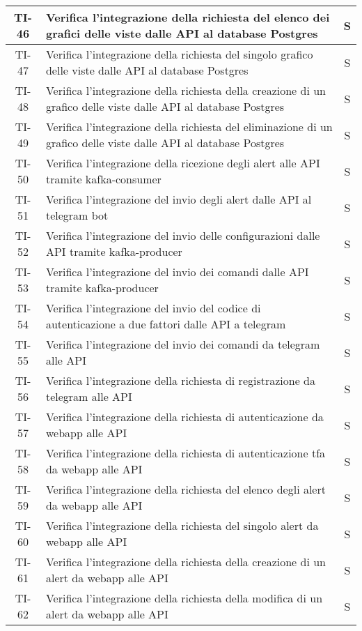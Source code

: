 \begin{center}
\begin{longtable}{|c|p{12cm}|c|}
			\hline
			TI-46 & Verifica l'integrazione della richiesta del elenco dei grafici delle viste dalle API al database Postgres & S \\
			\hline
			TI-47 & Verifica l'integrazione della richiesta del singolo grafico delle viste dalle API al database Postgres & S \\
			\hline
			TI-48 & Verifica l'integrazione della richiesta della creazione di un grafico delle viste dalle API al database Postgres & S \\
			\hline
			TI-49 & Verifica l'integrazione della richiesta del eliminazione di un grafico delle viste dalle API al database Postgres & S \\
			\hline
			TI-50 & Verifica l'integrazione della ricezione degli alert alle API tramite kafka-consumer & S \\
			\hline
			TI-51 & Verifica l'integrazione del invio degli alert dalle API al telegram bot & S \\
			\hline
			TI-52 & Verifica l'integrazione del invio delle configurazioni dalle API tramite kafka-producer & S \\
			\hline
			TI-53 & Verifica l'integrazione del invio dei comandi dalle API tramite kafka-producer & S \\
			\hline
			TI-54 & Verifica l'integrazione del invio del codice di autenticazione a due fattori dalle API a telegram & S \\
			\hline
			TI-55 & Verifica l'integrazione del invio dei comandi da telegram alle API & S \\
			\hline
			TI-56 & Verifica l'integrazione della richiesta di registrazione da telegram alle API & S \\
			\hline
			TI-57 & Verifica l'integrazione della richiesta di autenticazione da webapp alle API & S \\
			\hline
			TI-58 & Verifica l'integrazione della richiesta di autenticazione tfa da webapp alle API & S \\
			\hline
			TI-59 & Verifica l'integrazione della richiesta del elenco degli alert da webapp alle API & S \\
			\hline
			TI-60 & Verifica l'integrazione della richiesta del singolo alert da webapp alle API & S \\
			\hline
			TI-61 & Verifica l'integrazione della richiesta della creazione di un alert da webapp alle API & S \\
			\hline
			TI-62 & Verifica l'integrazione della richiesta della modifica di un alert da webapp alle API & S \\

\end{longtable}
\end{center}
